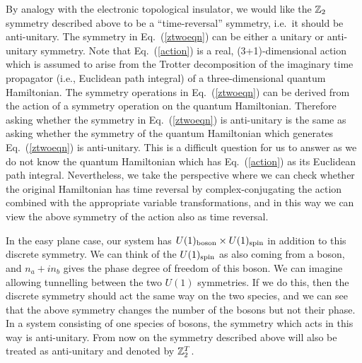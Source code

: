 By analogy with the electronic topological insulator, we would like the $\mathbb{Z}_2$ symmetry described above to be a ``time-reversal'' symmetry, i.e.~it should be anti-unitary. The symmetry in Eq.~(\ref{ztwoeqn}) can be either a unitary or anti-unitary symmetry. Note that Eq.~(\ref{action}) is a real, (3+1)-dimensional action which is assumed to arise from the Trotter decomposition of the imaginary time propagator (i.e., Euclidean path integral) of a three-dimensional quantum Hamiltonian. The symmetry operations in Eq.~(\ref{ztwoeqn}) can be derived from the action of a symmetry operation on the quantum Hamiltonian. Therefore asking whether the symmetry in Eq.~(\ref{ztwoeqn}) is anti-unitary is the same as asking whether the symmetry of the quantum Hamiltonian which generates Eq.~(\ref{ztwoeqn}) is anti-unitary. This is a difficult question for us to answer as we do not know the quantum Hamiltonian which has Eq.~(\ref{action}) as its Euclidean path integral.  Nevertheless, we take the perspective where we can check whether the original Hamiltonian has time reversal by complex-conjugating the action combined with the appropriate variable transformations, and in this way we can view the above symmetry of the action also as time reversal.

In the easy plane case, our system has $U(1)_{\rm boson}\times U(1)_{\rm spin}$ in addition to this discrete symmetry. We can think of the $U(1)_{\rm spin}$ as also coming from a boson, and $n_a+i n_b$ gives the phase degree of freedom of this boson. We can imagine allowing tunnelling between the two $U(1)$ symmetries. If we do this, then the discrete symmetry should act the same way on the two species, and we can see that the above symmetry changes the number of the bosons but not their phase. In a system consisting of one species of bosons, the symmetry which acts in this way is anti-unitary.
From now on the symmetry described above will also be treated as anti-unitary and denoted by $\mathbb{Z}_2^T$.

